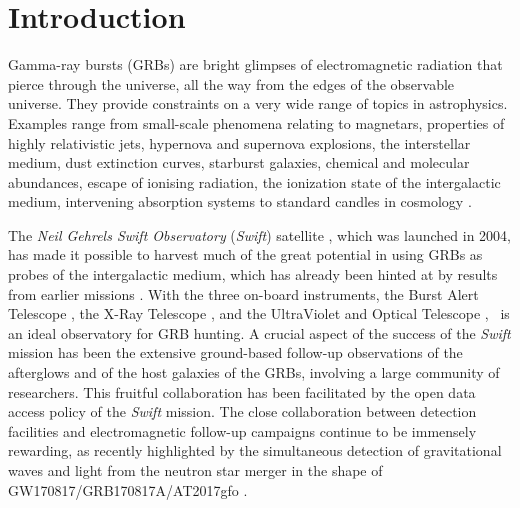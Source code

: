 \documentclass[longauth]{aa}    %
\begin{document}
\maketitle

\section{Introduction}

Gamma-ray bursts (GRBs) are bright glimpses of electromagnetic radiation that
pierce through the universe, all the way from the edges of the observable
universe. They provide constraints on a very wide range of topics in
astrophysics. Examples range from small-scale phenomena relating to magnetars,
properties of highly relativistic jets, hypernova and supernova explosions, the
interstellar medium, dust extinction curves, starburst galaxies, chemical and
molecular abundances, escape of ionising radiation, the ionization state of the
intergalactic medium, intervening absorption systems to standard candles in
cosmology \citep[e.g.][]{Wijers1998, Savaglio2006, Ghirlanda2007, Molinari2007,
	Amati2008, Vergani2009, Prochaska2009, HjorthBloom2012, Rowlinson2017,
	Christensen2017}.

The \textit{Neil Gehrels Swift Observatory} ({\it Swift}) satellite
\citep{Gehrels2004, Gehrels2009}, which was launched in 2004, has made it
possible to harvest much of the great potential in using GRBs as probes of the
intergalactic medium, which has already been hinted at by results from earlier
missions \citep[e.g.][]{Paradijs2000, Ricker2004}. With the three on-board
instruments, the Burst Alert Telescope \citep[BAT;][]{Barthelmy2005}, the X-Ray
Telescope \citep[XRT;][]{Burrows2005}, and the UltraViolet and Optical Telescope
\citep[UVOT;][]{Roming2005}, \swift~is an ideal observatory for GRB hunting. A
crucial aspect of the success of the {\it Swift} mission has been the extensive
ground-based follow-up observations of the afterglows and of the host galaxies
of the GRBs, involving a large community of researchers. This fruitful
collaboration has been facilitated by the open data access policy of the {\it
	Swift} mission. The close collaboration between detection facilities and
electromagnetic  follow-up campaigns continue to be immensely rewarding, as
recently highlighted by the simultaneous detection of gravitational waves and
light from the neutron star merger in the shape of GW170817/GRB170817A/AT2017gfo
\citep{2017ApJ...848L..14G, 2017ApJ...848L..15S, 2017ApJ...848L..16S,
	2017ApJ...848L..17C, 2017ApJ...848L..18N, 2017ApJ...848L..19C,
	2017ApJ...848L..27T, 2017ApJ...850L...1L, 2017Natur.551...64A,
	2017Natur.551...67P, 2017Natur.551...71T, 2017Natur.551...75S,
	2017Sci...358.1583K, 2017Sci...358.1556C, Burgess2017, LIGOScientificCollaboration2017a,
	LIGOScientificCollaboration2017}.
\end{document}

